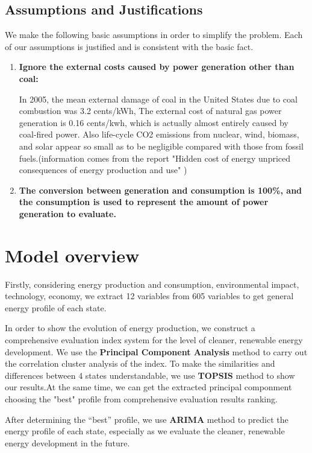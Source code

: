 \documentclass{mcmthesis}
\begin{document}
    \subsection{Assumptions and Justifications}
        \noindent
        We make the following basic assumptions in order to simplify the problem. Each of our assumptions is justified and is consistent with the basic fact.
        \begin{enumerate}
          \item \textbf{Ignore the external costs caused by power generation other than coal:}

              In 2005, the mean external damage of coal in the United States due to coal combustion was 3.2 cents/kWh, The external cost of natural gas power generation is 0.16 cents/kwh, which is actually almost entirely caused by coal-fired power. Also life-cycle CO2 emissions from nuclear, wind, biomass, and solar appear so small as to be negligible compared with those from fossil fuels.(information comes from the report "Hidden cost of energy unpriced consequences of energy production and use" )
          \item \textbf{The conversion between generation and consumption is 100\%, and the consumption is used to represent the amount of power generation to evaluate.}

        \end{enumerate}


\section{Model overview}
    Firstly, considering energy production and consumption, environmental impact, technology, economy, we extract 12 variables from 605 variables to get general energy profile of each state.

    In order to show the evolution of energy production, we construct a comprehensive evaluation index system for the level of cleaner, renewable energy development. We use the \textbf{Principal Component Analysis} method to carry out the correlation cluster analysis of the index. To make the similarities and differences between 4 states understandable, we use \textbf{TOPSIS} method to show our results.At the same time, we can get the extracted principal componment choosing the "best" profile from comprehensive evaluation results ranking.

    After determining the “best” profile, we use \textbf{ARIMA} method to predict the energy profile of each state, especially as we evaluate the cleaner, renewable energy development in the future.
\end{document}
